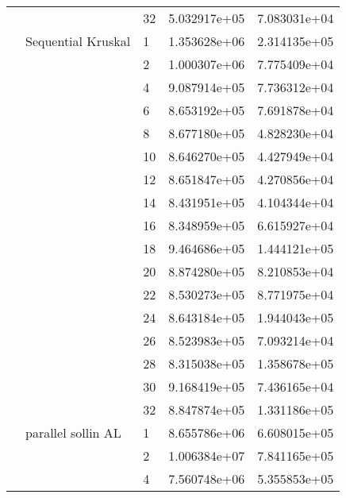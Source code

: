 \begin{tabular}{lllrr}
                      &                     & 32 &  5.032917e+05 &  7.083031e+04 \\
                      & Sequential Kruskal & 1  &  1.353628e+06 &  2.314135e+05 \\
                      &                     & 2  &  1.000307e+06 &  7.775409e+04 \\
                      &                     & 4  &  9.087914e+05 &  7.736312e+04 \\
                      &                     & 6  &  8.653192e+05 &  7.691878e+04 \\
                      &                     & 8  &  8.677180e+05 &  4.828230e+04 \\
                      &                     & 10 &  8.646270e+05 &  4.427949e+04 \\
                      &                     & 12 &  8.651847e+05 &  4.270856e+04 \\
                      &                     & 14 &  8.431951e+05 &  4.104344e+04 \\
                      &                     & 16 &  8.348959e+05 &  6.615927e+04 \\
                      &                     & 18 &  9.464686e+05 &  1.444121e+05 \\
                      &                     & 20 &  8.874280e+05 &  8.210853e+04 \\
                      &                     & 22 &  8.530273e+05 &  8.771975e+04 \\
                      &                     & 24 &  8.643184e+05 &  1.944043e+05 \\
                      &                     & 26 &  8.523983e+05 &  7.093214e+04 \\
                      &                     & 28 &  8.315038e+05 &  1.358678e+05 \\
                      &                     & 30 &  9.168419e+05 &  7.436165e+04 \\
                      &                     & 32 &  8.847874e+05 &  1.331186e+05 \\
                      & parallel sollin AL & 1  &  8.655786e+06 &  6.608015e+05 \\
                      &                     & 2  &  1.006384e+07 &  7.841165e+05 \\
                      &                     & 4  &  7.560748e+06 &  5.355853e+05 \\

\end{tabular}
